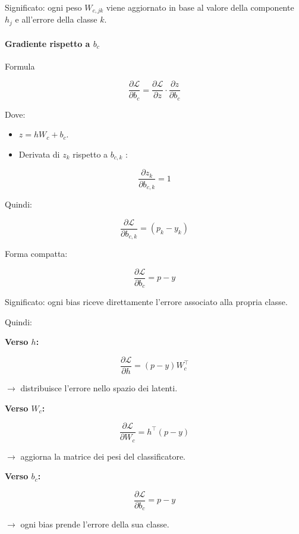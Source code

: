 \documentclass[
  11pt,
]{article}
\begin{document}
Significato: ogni peso \(W_{c,jk}\) viene aggiornato in base al valore
della componente \(h_{j}\) e all'errore della classe
\(k\).


\paragraph{Gradiente rispetto a $b_c$}


Formula

\[\frac{\partial\mathcal{L}}{\partial b_{c}} = \frac{\partial\mathcal{L}}{\partial z} \cdot \frac{\partial z}{\partial b_{c}}\]

Dove:


\begin{itemize}
\item
  \(z = hW_{c} + b_{c}\).
\item
  Derivata di \(z_{k}\) rispetto a \(b_{c,k}\) :
\end{itemize}


\[\frac{\partial z_{k}}{\partial b_{c,k}} = 1\]


Quindi:


\[\frac{\partial\mathcal{L}}{\partial b_{c,k}} = \left( p_{k} - y_{k} \right)\]


Forma compatta:


\[\frac{\partial\mathcal{L}}{\partial b_{c}} = p - y\]

Significato: ogni bias riceve direttamente l'errore
associato alla propria classe.


Quindi:

\textbf{Verso $h$:}

\[\frac{\partial\mathcal{L}}{\partial h} = (p - y)W_{c}^{\top}\]

$\rightarrow$ distribuisce l'errore nello spazio dei
latenti.

\textbf{Verso $W_c$:}

\[\frac{\partial\mathcal{L}}{\partial W_{c}} = h^{\top}(p - y)\]

$\rightarrow$ aggiorna la matrice dei pesi del classificatore.

\textbf{Verso $b_c$:}

\[\frac{\partial\mathcal{L}}{\partial b_{c}} = p - y\]

\(\rightarrow\) ogni bias prende l'errore della sua
classe.
\end{document}
